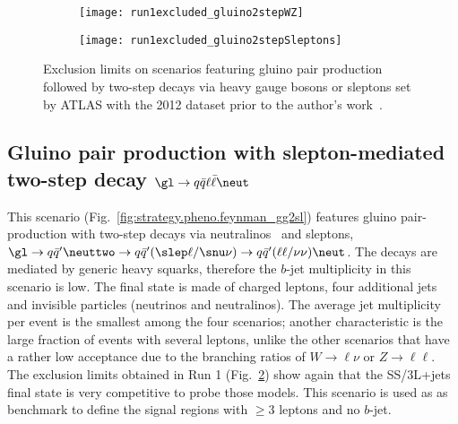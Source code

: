 \begin{figure}[t]
\centering
\begin{subfigure}[t]{0.49\textwidth}\texttt{[image: run1excluded\_gluino2stepWZ]}\caption{}\label{fig:strategy.pheno.run1excluded_gluino2stepWZ}\end{subfigure} 
\begin{subfigure}[t]{0.49\textwidth}\texttt{[image: run1excluded\_gluino2stepSleptons]}\caption{}\label{fig:strategy.pheno.run1excluded_gluino2stepSleptons}\end{subfigure}
\caption{Exclusion limits on scenarios featuring gluino pair production followed by two-step decays via heavy gauge bosons or sleptons 
set by ATLAS with the 2012 dataset prior to the author's work~\cite{SUSY-2014-06}.}
\label{fig:strategy.pheno.run1excluded_1stgen}
\end{figure}

\subsection*{Gluino pair production with slepton-mediated two-step decay $\gl\to q\bar q\ell\bar\ell\neut$}
\label{subsec:signals_g2slep}

This scenario (Fig.~\ref{fig:strategy.pheno.feynman_gg2sl}) features gluino pair-production with two-step decays via neutralinos \neuttwo\ and sleptons, 
$\gl\to q\bar{q}'\neuttwo \to q\bar{q}'(\slep\ell/\snu\nu) \to q\bar{q}'(\ell\ell/\nu\nu)\neut$. 
The decays are mediated by generic heavy squarks, therefore the $b$-jet multiplicity in this scenario is low. 
The final state is made of charged leptons, four additional jets and invisible particles (neutrinos and neutralinos). 
The average jet multiplicity per event is the smallest among the four scenarios;  
another characteristic is the large fraction of events with several leptons, 
unlike the other scenarios that have a rather low acceptance due to the branching ratios of $W\to\ell\nu$ or $Z\to\ell\ell$. 
The exclusion limits obtained in Run 1 (Fig.~\ref{fig:strategy.pheno.run1excluded_gluino2stepSleptons}) show again that the SS/3L+jets final state 
is very competitive to probe those models. 
This scenario is used as as benchmark to define the signal regions with $\ge 3$ leptons and no $b$-jet. 

